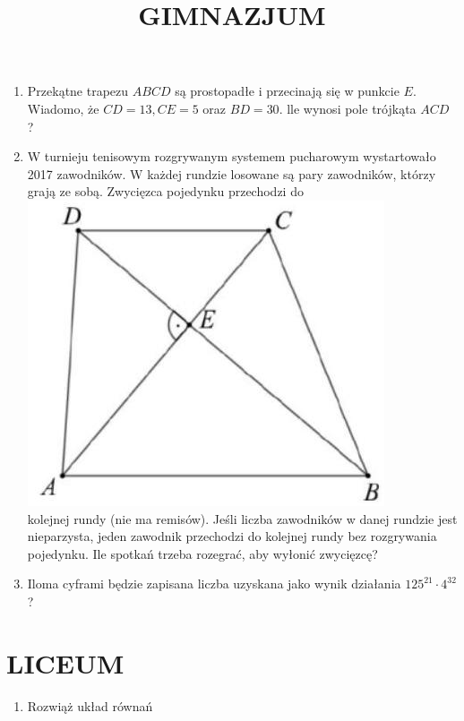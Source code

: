 \documentclass[10pt]{article}
\title{GIMNAZJUM }
\author{}
\date{}
\begin{document}
\maketitle
\begin{enumerate}
  \item Przekątne trapezu \(A B C D\) są prostopadłe i przecinają się w punkcie \(E\). Wiadomo, że \(C D=13, C E=5\) oraz \(B D=30\). lle wynosi pole trójkąta \(A C D\) ?
  \item W turnieju tenisowym rozgrywanym systemem pucharowym wystartowało 2017 zawodników. W każdej rundzie losowane są pary zawodników, którzy grają ze sobą. Zwycięzca pojedynku przechodzi do\\
\includegraphics[max width=\textwidth, center]{2024_11_21_ea6946dc5e9ed6632317g-1}\\
kolejnej rundy (nie ma remisów). Jeśli liczba zawodników w danej rundzie jest nieparzysta, jeden zawodnik przechodzi do kolejnej rundy bez rozgrywania pojedynku. Ile spotkań trzeba rozegrać, aby wyłonić zwycięzcę?
  \item Iloma cyframi będzie zapisana liczba uzyskana jako wynik działania \(125^{21} \cdot 4^{32}\) ?
\end{enumerate}

\section*{LICEUM}
\begin{enumerate}
  \item Rozwiąż układ równań
\end{enumerate}
\end{document}
